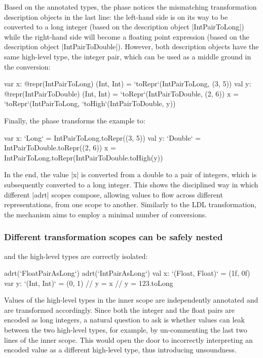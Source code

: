 Based on the annotated types, the \coerce{} phase notices the mismatching transformation description objects in the last line: the left-hand side is on its way to be converted to a long integer (based on the description object |IntPairToLong|) while the right-hand side will become a floating point expression (based on the description object |IntPairToDouble|). However, both description objects have the same high-level type, the integer pair, which can be used as a middle ground in the conversion:

\begin{lstlisting-nobreak}
var x: @repr(IntPairToLong) (Int, Int) = `toRepr`(IntPairToLong, (3, 5))
val y: @repr(IntPairToDouble) (Int, Int) = `toRepr`(IntPairToDouble, (2, 6))
x = `toRepr`(IntPairToLong, `toHigh`(IntPairToDouble, y))
\end{lstlisting-nobreak}

Finally, the \commit{} phase transforms the example to:

\begin{lstlisting-nobreak}
var x: `Long` = IntPairToLong.toRepr((3, 5))
val y: `Double` = IntPairToDouble.toRepr((2, 6))
x = IntPairToLong.toRepr(IntPairToDouble.toHigh(y))
\end{lstlisting-nobreak}

In the end, the value |x| is converted from a double to a pair of integers, which is subsequently converted to a long integer. This shows the disciplined way in which different |adrt| scopes compose, allowing values to flow across different representations, from one scope to another. Similarly to the LDL transformation, the mechanism aims to employ a minimal number of conversions.



\subsubsection*{Different transformation scopes can be safely nested} and the high-level types are correctly isolated:

\begin{lstlisting-nobreak}
adrt(`FloatPairAsLong`) {
  adrt(`IntPairAsLong`) {
    val x: `(Float, Float)` = (1f, 0f)
    var y: `(Int, Int)` = (0, 1)
    // y = x
    // y = 123.toLong
  }
}
\end{lstlisting-nobreak}

Values of the high-level types in the inner scope are independently annotated and are transformed accordingly. Since both the integer and the float pairs are encoded as long integers, a natural question to ask is whether values can leak between the two high-level types, for example, by un-commenting the last two lines of the inner scope. This would open the door to incorrectly interpreting an encoded value as a different high-level type, thus introducing unsoundness.

